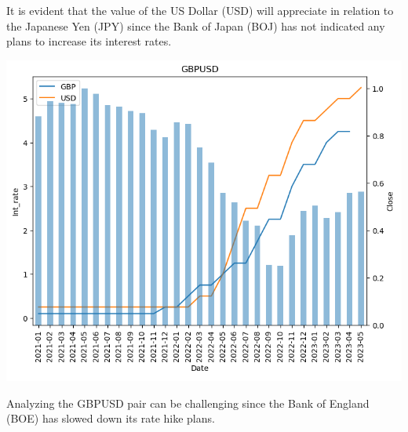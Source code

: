 \documentclass{article}
\begin{document}
It is evident that the value of the US Dollar (USD) will appreciate in relation to the Japanese Yen (JPY) since the Bank of Japan (BOJ) has not indicated any plans to increase its interest rates.

\begin{center}
    \includegraphics[scale=0.8]{p15.png}    
\end{center}
Analyzing the GBPUSD pair can be challenging since the Bank of England (BOE) has slowed down its rate hike plans.
\end{document}

